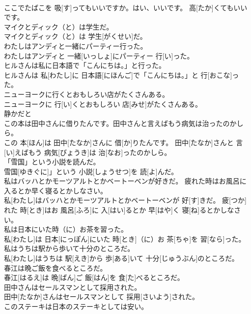\documentclass[8pt]{extreport}
\begin{document}
\begin{CJK}{UTF8}{min}
\\	ここでたばこを 吸[す]ってもいいですか。はい、いいです。 高[たか]くてもいいです。	
\\	マイクとディック（と）は学生だ。	
\\	マイクとディック（と）は 学生[がくせい]だ。	
\\	わたしはアンディと一緒にパーティー行った。	
\\	わたしはアンディと 一緒[いっしょ]にパーティー 行[い]った。	
\\	ヒルさんは私に日本語で「こんにちは。」と行った。	
\\	ヒルさんは 私[わたし]に 日本語[にほんご]で「こんにちは。」と 行[おこな]った。	
\\	ニューヨークに行くとおもしろい店がたくさんある。	
\\	ニューヨークに 行[い]くとおもしろい 店[みせ]がたくさんある。	
\\	静かだと	
\\	この本は田中さんに借りたんです。田中さんと言えばもう病気は治ったのかしら。	
\\	この 本[ほん]は 田中[たなか]さんに 借[か]りたんです。 田中[たなか]さんと 言[い]えばもう 病気[びょうき]は 治[なお]ったのかしら。	
\\	「雪国」という小説を読んだ。	
\\	雪国[ゆきぐに]」という 小説[しょうせつ]を 読[よ]んだ。	
\\	私はバッハとかモーツアルトとかベートーベンが好きだ。 疲れた時はお風呂に入るとか早く寝るとかしなさい。	
\\	私[わたし]はバッハとかモーツアルトとかベートーベンが 好[す]きだ。 疲[つか]れた 時[とき]はお 風呂[ふろ]に 入[はい]るとか 早[はや]く 寝[ね]るとかしなさい。	
\\	私は日本にいた時（に）お茶を習った。	
\\	私[わたし]は 日本[にっぽん]にいた 時[とき]（に）お 茶[ちゃ]を 習[なら]った。	
\\	私はうちは駅から歩いて十分のところだ。	
\\	私[わたし]はうちは 駅[えき]から 歩[ある]いて 十分[じゅうぶん]のところだ。	
\\	春江は晩ご飯を食べるところだ。	
\\	春江[はるえ]は 晩[ばん]ご 飯[はん]を 食[た]べるところだ。	
\\	田中さんはセールスマンとして採用された。	
\\	田中[たなか]さんはセールスマンとして 採用[さいよう]された。	
\\	このステーキは日本のステーキとしては安い。	

\end{CJK}
\end{document}
